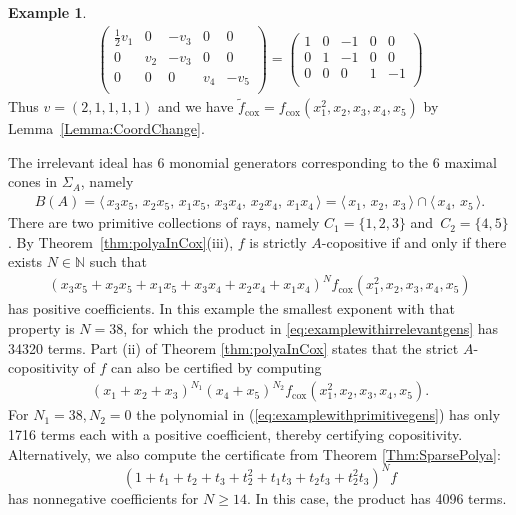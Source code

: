 \documentclass[a4paper,11pt]{amsart}
\theoremstyle{definition}
\newtheorem{example}[theorem]{Example}
\newcommand{\NN}{\mathbb{N}}
\newcommand{\cox}{\mathrm{cox}}
\begin{document}
\begin{example}
\begin{align}
\begin{pmatrix}
        \tfrac{1}{2}v_1 & 0 & -v_3 & 0 & 0 \\
        0 & v_2 & -v_3 & 0 & 0 \\
        0 & 0 &  0 & v_4 & -v_5 \\
    \end{pmatrix} = \begin{pmatrix}
        1 & 0 & -1 & 0 & 0 \\
        0 & 1 & -1 & 0 & 0 \\
        0 & 0 &  0 & 1 & -1 \\
    \end{pmatrix}
\end{align}
 Thus $v = (2,1,1,1,1)$ and we have $\widetilde{f}_\cox = f_\cox(x_1^2,x_2,x_3,x_4,x_5)$ by Lemma~\ref{Lemma:CoordChange}.

The irrelevant ideal has 6 monomial generators corresponding to the 6 maximal cones in $\Sigma_A$, namely 
\begin{align*}
     B(A) =\langle\, x_3x_5,\, x_2x_5,\, x_1x_5,\, x_3x_4,\, x_2x_4,\, x_1x_4\,\rangle=\langle\, x_1,\,x_2,\,x_3\,\rangle \cap\langle\, x_4,\,x_5\,\rangle.
 \end{align*}
 There are two primitive collections of rays, namely $C_1=\{1,2,3\}$ and $\,C_2=\{4,5\}$. By Theorem~\ref{thm:polyaInCox}(iii), $f$ is strictly $A$-copositive if and only if there exists $N\in \NN$ such that \begin{align}
 \label{eq:examplewithirrelevantgens}
(x_3x_5+x_2x_5+x_1x_5+x_3x_4+x_2x_4+x_1x_4)^N f_\cox(x_1^2,x_2,x_3,x_4,x_5)
 \end{align}
 has positive coefficients. In this example the smallest exponent with that property is $N=38$, for which the product in \eqref{eq:examplewithirrelevantgens} has 34320 terms. Part (ii) of Theorem \ref{thm:polyaInCox} states that the strict $A$-copositivity of $f$ can also be certified by computing
 \begin{align}
 \label{eq:examplewithprimitivegens}
     (x_1+x_2+x_3)^{N_1}(x_4+x_5)^{N_2}f_\cox(x_1^2,x_2,x_3,x_4,x_5).
 \end{align}
 For $N_1=38,N_2=0$ the polynomial in (\ref{eq:examplewithprimitivegens}) has only 1716 terms each with a positive coefficient, thereby certifying copositivity. Alternatively, we also compute the certificate from Theorem \ref{Thm:SparsePolya}: 
 \[ (1+t_1+t_2+t_3+t_2^2+t_1t_3+t_2t_3+t_2^2t_3)^N f\]
 has nonnegative coefficients for $N\geq 14$. In this case, the product has 4096 terms.
\end{example}
\end{document}
